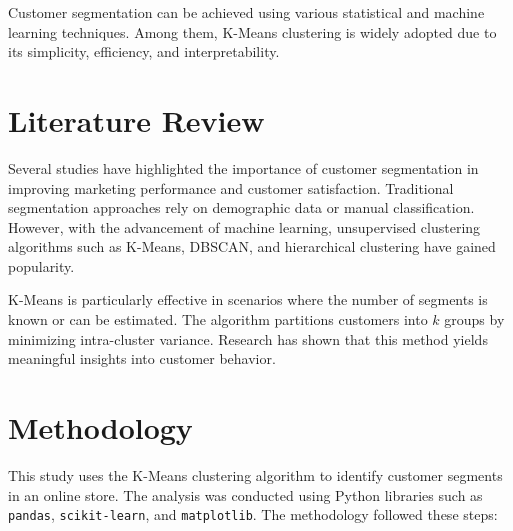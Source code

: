\documentclass[conference]{IEEEtran}
\begin{document}
Customer segmentation can be achieved using various statistical and machine learning techniques. Among them, K-Means clustering is widely adopted due to its simplicity, efficiency, and interpretability.

\section{Literature Review}
Several studies have highlighted the importance of customer segmentation in improving marketing performance and customer satisfaction. Traditional segmentation approaches rely on demographic data or manual classification. However, with the advancement of machine learning, unsupervised clustering algorithms such as K-Means, DBSCAN, and hierarchical clustering have gained popularity.

K-Means is particularly effective in scenarios where the number of segments is known or can be estimated. The algorithm partitions customers into $k$ groups by minimizing intra-cluster variance. Research has shown that this method yields meaningful insights into customer behavior.

\section{Methodology}
This study uses the K-Means clustering algorithm to identify customer segments in an online store. The analysis was conducted using Python libraries such as \texttt{pandas}, \texttt{scikit-learn}, and \texttt{matplotlib}. The methodology followed these steps:
\end{document}

